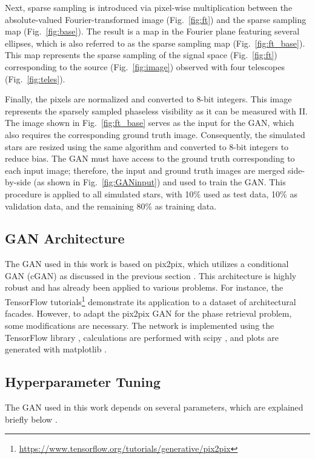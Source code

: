 Next, sparse sampling is introduced via pixel-wise multiplication between the absolute-valued Fourier-transformed image (Fig.~\ref{fig:ft}) and the sparse sampling map (Fig.~\ref{fig:base}). The result is a map in the Fourier plane featuring several ellipses, which is also referred to as the sparse sampling map (Fig.~\ref{fig:ft_base}). This map represents the sparse sampling of the signal space (Fig.~\ref{fig:ft}) corresponding to the source (Fig.~\ref{fig:image}) observed with four telescopes (Fig.~\ref{fig:teles}). 

Finally, the pixels are normalized and converted to 8-bit integers. This image represents the sparsely sampled phaseless visibility as it can be measured with II. The image shown in Fig.~\ref{fig:ft_base} serves as the input for the GAN, which also requires the corresponding ground truth image. Consequently, the simulated stars are resized using the same algorithm and converted to 8-bit integers to reduce bias. The GAN must have access to the ground truth corresponding to each input image; therefore, the input and ground truth images are merged side-by-side (as shown in Fig.~\ref{fig:GANinput}) and used to train the GAN. This procedure is applied to all simulated stars, with 10\% used as test data, 10\% as validation data, and the remaining 80\% as training data.


\subsection{GAN Architecture}
The GAN used in this work is based on pix2pix, which utilizes a conditional GAN (cGAN) as discussed in the previous section \citep{isola2017image}. This architecture is highly robust and has already been applied to various problems. For instance, the TensorFlow tutorials\footnote{\url{https://www.tensorflow.org/tutorials/generative/pix2pix}} demonstrate its application to a dataset of architectural facades. However, to adapt the pix2pix GAN for the phase retrieval problem, some modifications are necessary. The network is implemented using the TensorFlow library \citep{abadi2016tensorflow}, calculations are performed with scipy \citep{virtanen2020scipy}, and plots are generated with matplotlib \citep{4160265}.

\subsection{Hyperparameter Tuning}
The GAN used in this work depends on several parameters, which are explained briefly below \citep[for a more in-depth discussion, see][]{murphy2022probabilistic}.

